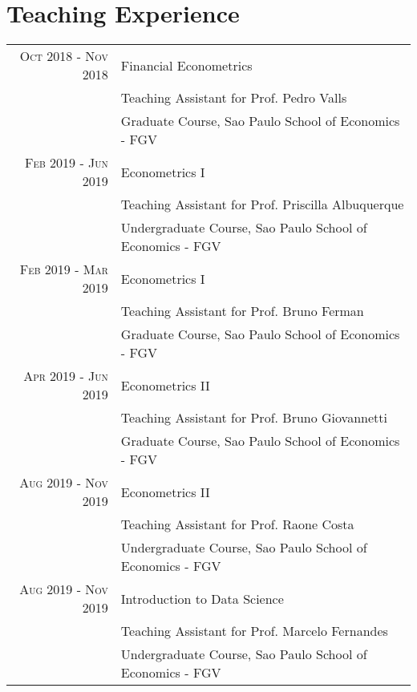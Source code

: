 \documentclass[a4paper,10pt]{article}
\begin{document}
\section{Teaching Experience}
\begin{tabular}{r|p{10.5cm}}
\textsc{Oct} 2018 - \textsc{Nov} 2018 & Financial Econometrics \\
& \footnotesize{Teaching Assistant for Prof. Pedro Valls} \\
& \footnotesize{Graduate Course, Sao Paulo School of Economics - FGV} \\
\textsc{Feb} 2019 - \textsc{Jun} 2019 & Econometrics I \\
& \footnotesize{Teaching Assistant for Prof. Priscilla Albuquerque} \\
& \footnotesize{Undergraduate Course, Sao Paulo School of Economics - FGV} \\
\textsc{Feb} 2019 - \textsc{Mar} 2019 & Econometrics I \\
& \footnotesize{Teaching Assistant for Prof. Bruno Ferman} \\
& \footnotesize{Graduate Course, Sao Paulo School of Economics - FGV} \\
\textsc{Apr} 2019 - \textsc{Jun} 2019 & Econometrics II \\
& \footnotesize{Teaching Assistant for Prof. Bruno Giovannetti} \\
& \footnotesize{Graduate Course, Sao Paulo School of Economics - FGV} \\
\textsc{Aug} 2019 - \textsc{Nov} 2019 & Econometrics II \\
& \footnotesize{Teaching Assistant for Prof. Raone Costa} \\
& \footnotesize{Undergraduate Course, Sao Paulo School of Economics - FGV} \\
\textsc{Aug} 2019 - \textsc{Nov} 2019 & Introduction to Data Science \\
& \footnotesize{Teaching Assistant for Prof. Marcelo Fernandes} \\
& \footnotesize{Undergraduate Course, Sao Paulo School of Economics - FGV} \\
\end{tabular}
\end{document}
